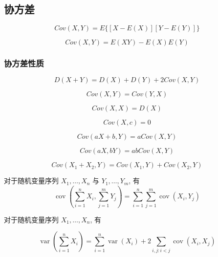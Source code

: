 \subsection{协方差}

\begin{equation}
 Cov(X,Y) = E\Big\{ [X - E(X)][Y-E(Y)] \Big\}
\end{equation}

\begin{equation}
 Cov(X,Y) = E(XY) - E(X)E(Y)
\end{equation}

\subsubsection{协方差性质}

\begin{equation}
 D(X+Y) = D(X)+D(Y)+2Cov(X,Y)
\end{equation}

\begin{equation}
 Cov(X,Y) = Cov(Y,X)
\end{equation}

\begin{equation}
 Cov(X,X) = D(X)
\end{equation}

\begin{equation} Cov(X,c) = 0 \end{equation}

\begin{equation} Cov(a X + b, Y) = a Cov( X,Y) \end{equation}

\begin{equation} Cov(aX, bY) = ab Cov(X, Y) \end{equation}

\begin{equation} Cov(X_1 + X_2 , Y) = Cov(X_1 , Y) + Cov(X_2 , Y) \end{equation}

对于随机变量序列 $ X_{1}, \ldots, X_{n} $ 与 $ Y_{1}, \ldots, Y_{m} $, 有
\begin{equation}
\operatorname{cov}\left(\sum_{i=1}^{n} X_{i}, \sum_{j=1}^{m} Y_{j}\right)=\sum_{i=1}^{n} \sum_{j=1}^{m} \operatorname{cov}\left(X_{i}, Y_{j}\right)
\end{equation}

对于随机变量序列 $ X_{1}, \ldots, X_{n} $, 有

\begin{equation}
\operatorname{var}\left(\sum_{i=1}^{n} X_{i}\right)=\sum_{i=1}^{n} \operatorname{var}\left(X_{i}\right)+2 \sum_{i, j: i<j} \operatorname{cov}\left(X_{i}, X_{j}\right)
\end{equation}


